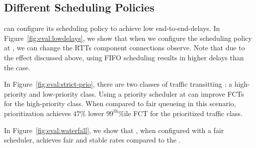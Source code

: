 \subsection{Different Scheduling Policies}\label{s:eval:policies}


\name can configure its scheduling policy to achieve low end-to-end-delays.
In Figure~\ref{fig:eval:lowdelays}, we show that when we configure the scheduling policy at \inbox, we can change the RTTs component connections observe.
Note that due to the effect discussed above, using FIFO scheduling results in higher delays than the \baseline case.

\label{s:eval:strictprio}
In Figure~\ref{fig:eval:strict-prio}, there are two classes of traffic transitting \name: a high-priority and low-priority class. Using a priority scheduler at \name can improve FCTs for the high-priority class. 
When compared to fair queueing in this scenario, prioritization achieves $47$\% lower $99^{\text{th}}$\%ile FCT for the prioritized traffic class.



\label{s:eval:waterfall}
In Figure~\ref{fig:eval:waterfall}, we show that \name, when configured with a fair scheduler, achieves fair and stable rates compared to the \baseline.


